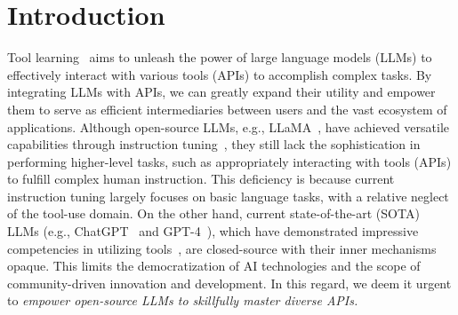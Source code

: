 \section{Introduction}
\label{sec:introduction}
Tool learning~\citep{qin2023tool} aims to unleash the power of large language models (LLMs) to effectively interact with various tools (APIs) to accomplish complex tasks. By integrating LLMs with APIs, we can greatly expand their utility and empower them to serve as efficient intermediaries between users and the vast ecosystem of applications. Although open-source LLMs, e.g., LLaMA~\citep{touvron2023llama}, have achieved versatile capabilities through instruction tuning~\citep{alpaca,vicuna2023}, they still lack the sophistication in performing higher-level tasks, such as appropriately interacting with tools (APIs) to fulfill complex human instruction.
This deficiency is because current instruction tuning largely focuses on basic language tasks, with a relative neglect of the tool-use domain.
On the other hand, current state-of-the-art (SOTA) LLMs (e.g., ChatGPT~\citep{openaichatgptblog} and GPT-4~\citep{openai2023gpt4}), which have demonstrated impressive competencies in utilizing tools~\citep{bubeck2023sparks}, are closed-source with their inner mechanisms opaque. This limits the democratization of AI technologies and the scope of community-driven innovation and development.
In this regard, we deem it urgent to \textit{empower open-source LLMs to skillfully master diverse APIs.}


